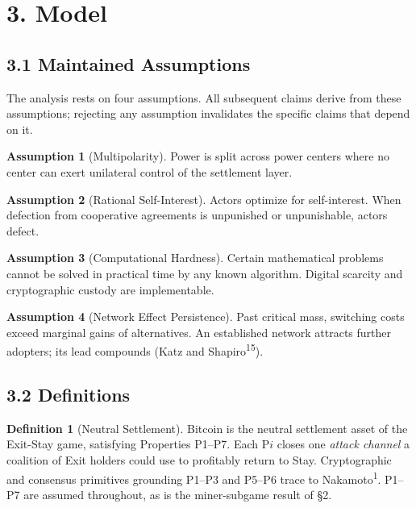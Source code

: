\documentclass[12pt]{article}
\theoremstyle{definition}
\newtheorem{definition}{Definition}
\newtheorem{assumption}{Assumption}
\theoremstyle{remark}
\begin{document}

\section{3. Model}

\subsection{3.1 Maintained Assumptions}

The analysis rests on four assumptions. All subsequent claims derive from these assumptions; rejecting any assumption invalidates the specific claims that depend on it.

\begin{assumption}[Multipolarity]
Power is split across power centers where no center can exert unilateral control of the settlement layer.
\end{assumption}

\begin{assumption}[Rational Self-Interest]
Actors optimize for self-interest. When defection from cooperative
agreements is unpunished or unpunishable, actors defect.
\end{assumption}

\begin{assumption}[Computational Hardness]
Certain mathematical problems cannot be solved in practical time by any known algorithm. Digital scarcity and cryptographic custody are implementable.
\end{assumption}

\begin{assumption}[Network Effect Persistence]
Past critical mass, switching costs exceed marginal gains of alternatives. An established network attracts further adopters; its lead compounds (Katz and Shapiro\textsuperscript{15}).
\end{assumption}

\subsection{3.2 Definitions}

\begin{definition}[Neutral Settlement]
Bitcoin is the neutral settlement asset of the Exit-Stay game, satisfying Properties P1--P7. Each P$i$ closes one \emph{attack channel} a coalition of Exit holders could use to profitably return to Stay. Cryptographic and consensus primitives grounding P1--P3 and P5--P6 trace to Nakamoto\textsuperscript{1}. P1--P7 are assumed throughout, as is the miner-subgame result of \S2.
\end{definition}
\end{document}
